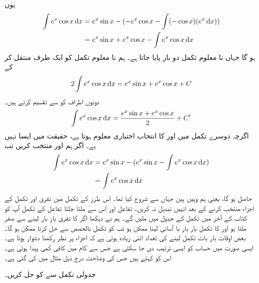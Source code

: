 یوں
\begin{align*}
\int e^x\cos x\dif x&=e^x\sin x-(-e^x\cos x-\int(-\cos x)(e^x\dif x))\\
&=e^x\sin x+e^x\cos x-\int e^x\cos x\dif x
\end{align*}
ہو گا جہاں نا معلوم تکمل  دو بار پایا جاتا ہے۔ ہم نا معلوم تکمل کو ایک طرف منتقل کر کے
\begin{align*}
2\int e^x\cos x\dif x=e^x\sin x+e^x\cos x+C
\end{align*}
دونوں اطراف کو  سے تقسیم کرتے ہیں۔
\begin{align*}
\int e^x\cos x\dif x=\frac{e^x\sin x+e^x\cos x}{2}+C'
\end{align*}
اگرچہ دوسرے تکمل میں  اور  کا انتخاب اختیاری معلوم ہوتا ہے، حقیقت میں ایسا نہیں ہے۔ اگر ہم  اور  منتخب کریں تب
\begin{align*}
\int e^x\cos x\dif x&=e^x\sin x-(e^x\sin x-\int e^x\cos x\dif x)\\
&=\int e^x\cos x\dif x
\end{align*} 
حاصل ہو گا، یعنی ہم وہیں ہیں جہاں سے شروع کیا تھا۔ اس طرز کے تکمل میں تفرق اور تکمل کے اجزاء منتخب کرنے کے بعد انہیں تبدیل نہ کریں۔ تفاعل  اور اس سے ملتا جلتا تفاعل  کے تکمل آپ کو کتاب کے آخر میں تکمل کے جدول میں ملیں گے۔
ہم نے دیکھا اگر  کا تفرق بار بار لینے سے صفر ملتا ہو اور  کا تکمل بار بار با آسانی لینا ممکن ہو تب   کو تکمل بالحصص سے حل کرنا ممکن ہو گا۔ بعض اوقات بار بات تکمل لینے کی تعداد اتنی زیادہ ہوتی ہے کہ اجزاء پر نظر رکھنا دشوار ہوتا ہے۔ ایسی صورت میں حساب کو ایسی ترتیب دی جا سکتی ہے جس سے کام میں کافی کمی پیدا ہوتی ہے۔ اس کو  کہتے ہیں جس کی وضاحت درج ذیل مثال میں کی گئی ہے۔  

جدولی تکمل سے  کو حل کریں۔

